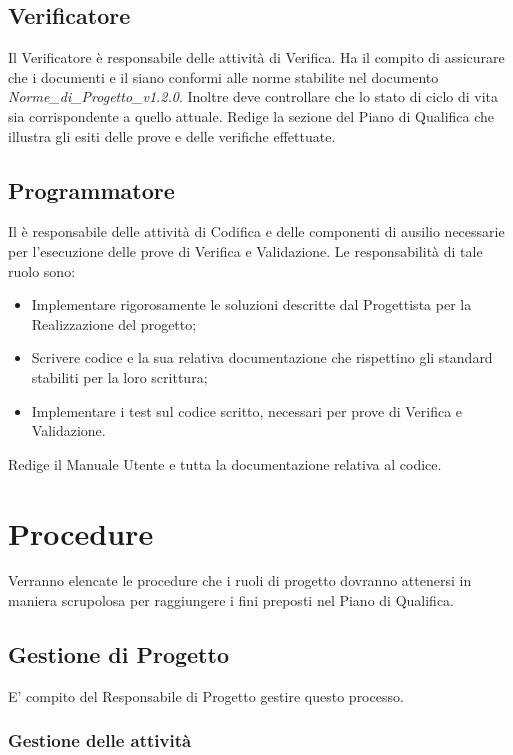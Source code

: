 \subsection{Verificatore}
\label{2.5}
Il Verificatore è responsabile delle attività di Verifica. Ha il compito di assicurare che i documenti e il  siano conformi alle norme stabilite nel documento \emph{Norme\_di\_Progetto\_v1.2.0}. Inoltre deve controllare che lo stato di ciclo di vita sia corrispondente a quello attuale.
Redige la sezione del Piano di Qualifica che illustra gli esiti delle prove e delle verifiche effettuate.

\subsection{Programmatore}
\label{2.6}
Il  è responsabile delle attività di Codifica e delle componenti di ausilio
necessarie per l'esecuzione delle prove di Verifica e Validazione. Le responsabilità di tale ruolo sono:
\begin{itemize}
\item Implementare rigorosamente le soluzioni descritte dal Progettista per la Realizzazione del progetto;
\item Scrivere codice e la sua relativa documentazione che rispettino gli standard stabiliti per la loro scrittura;
\item Implementare i test sul codice scritto, necessari per prove di Verifica e Validazione.
\end{itemize}
Redige il Manuale Utente e tutta la documentazione relativa al codice.



\newpage
\section{Procedure}
\label{6.0}
Verranno elencate le procedure che i ruoli di progetto dovranno attenersi in maniera scrupolosa per raggiungere i fini preposti nel Piano di Qualifica.

\subsection{Gestione di Progetto}
E' compito del Responsabile di Progetto gestire questo processo.
\label{}

\subsubsection{Gestione delle attività}
\label{}

